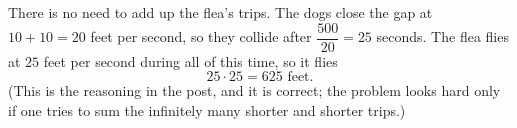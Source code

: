There is no need to add up the flea's trips. The dogs close the gap at $10+10=20$ feet per second, so they collide after $\dfrac{500}{20}=25$ seconds. The flea flies at $25$ feet per second during all of this time, so it flies
\[
25\cdot25=\boxed{625\text{ feet}}.
\]
(This is the reasoning in the post, and it is correct; the problem looks hard only if one tries to sum the infinitely many shorter and shorter trips.)
